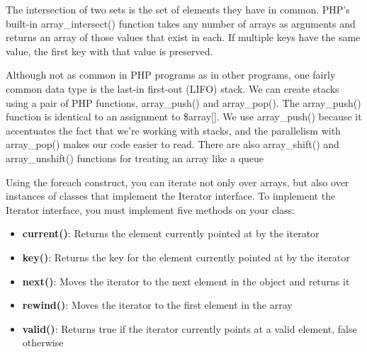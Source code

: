 \documentclass{report}
\begin{document}
\bigbreak \noindent 
The intersection of two sets is the set of elements they have in common. PHP’s built-in
array\_intersect() function takes any number of arrays as arguments and returns an
array of those values that exist in each. If multiple keys have the same value, the first
key with that value is preserved.


\pagebreak 
{}
\bigbreak \noindent 
Although not as common in PHP programs as in other programs, one fairly common
data type is the last-in first-out (LIFO) stack. We can create stacks using a pair of PHP
functions, array\_push() and array\_pop(). The array\_push() function is identical to an
assignment to \$array[]. We use array\_push() because it accentuates the fact that we’re
working with stacks, and the parallelism with array\_pop() makes our code easier to
read. There are also array\_shift() and array\_unshift() functions for treating an array
like a queue

\pagebreak 
{}
\bigbreak \noindent 
Using the foreach construct, you can iterate not only over arrays, but also over instances
of classes that implement the Iterator interface. To implement the Iterator interface, you must implement
five methods on your class:
\begin{itemize}
    \item \textbf{current()}: Returns the element currently pointed at by the iterator
    \item \textbf{key()}: Returns the key for the element currently pointed at by the iterator
    \item \textbf{next()}: Moves the iterator to the next element in the object and returns it
    \item \textbf{rewind()}: Moves the iterator to the first element in the array
    \item \textbf{valid()}: Returns true if the iterator currently points at a valid element, false otherwise
\end{itemize}

\pagebreak 
{}
\bigbreak \noindent 
\end{document}
